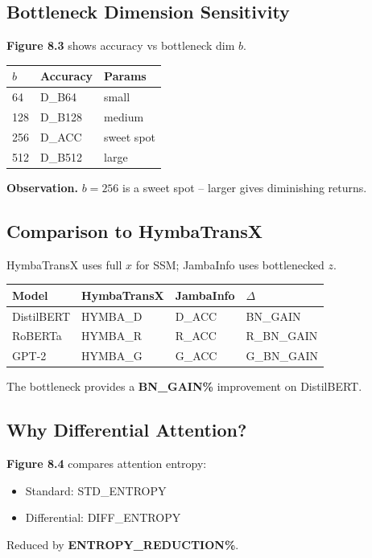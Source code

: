 \subsection{Bottleneck Dimension Sensitivity}

\textbf{Figure 8.3} shows accuracy vs bottleneck dim $b$.

\begin{table}[H]
\centering
\small
\begin{tabular}{lll}
\toprule
\textbf{$b$} & \textbf{Accuracy} & \textbf{Params} \\
\midrule
64 & {{D\_B64}} & small \\
128 & {{D\_B128}} & medium \\
256 & {{D\_ACC}} & sweet spot \\
512 & {{D\_B512}} & large \\
\bottomrule
\end{tabular}
\end{table}

\textbf{Observation.} $b = 256$ is a sweet spot -- larger gives diminishing returns.

\subsection{Comparison to HymbaTransX}

HymbaTransX uses full $x$ for SSM; JambaInfo uses bottlenecked $z$.

\begin{table}[H]
\centering
\small
\begin{tabular}{llll}
\toprule
\textbf{Model} & \textbf{HymbaTransX} & \textbf{JambaInfo} & \textbf{$\Delta$} \\
\midrule
DistilBERT & {{HYMBA\_D}} & {{D\_ACC}} & {{BN\_GAIN}} \\
RoBERTa & {{HYMBA\_R}} & {{R\_ACC}} & {{R\_BN\_GAIN}} \\
GPT-2 & {{HYMBA\_G}} & {{G\_ACC}} & {{G\_BN\_GAIN}} \\
\bottomrule
\end{tabular}
\end{table}

The bottleneck provides a \textbf{{{BN\_GAIN}}\%} improvement on DistilBERT.

\subsection{Why Differential Attention?}

\textbf{Figure 8.4} compares attention entropy:
\begin{itemize}
\item Standard: {{STD\_ENTROPY}}
\item Differential: {{DIFF\_ENTROPY}}

\end{itemize}
Reduced by \textbf{{{ENTROPY\_REDUCTION}}\%}.

